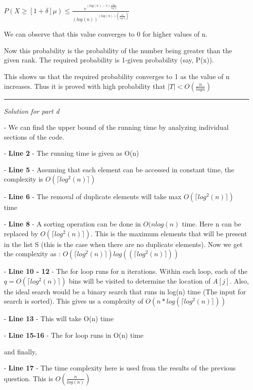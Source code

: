 \documentclass[11pt]{article}
\begin{document}
$P(X\geq [1+\delta]\mu) \leq \frac{e^{(log (n) -1) \frac{n}{log^2 n}}}{(log(n))^{(log(n))(\frac{n}{log^2 n})}}$

We can observe that this value converges to 0 for higher values of n.

Now this probability is the probability of the number being greater than the given rank. The required probability is 1-given probability (say, P(x)).

This shows us that the required probability converges to 1 as the value of n increases. Thus it is proved with high probability that $|T| < O(\frac{n}{log n})$ 





\medskip

\noindent\rule{8cm}{0.4pt}

\medskip

\textit{Solution for part d}

\medskip

- We can find the upper bound of the running time by analyzing individual sections of the code.

- {\bf Line 2} - The running time is given as O(n)

- {\bf Line 5} - Assuming that each element can be accessed in constant time, the complexity is $O(\lceil log^2 (n)\rceil)$

- {\bf Line 6} - The removal of duplicate elements will take max $O(\lceil log^2 (n)\rceil)$ time

- {\bf Line 8} - A sorting operation can be done in $O(n log(n)$ time. Here n can be replaced by $O(\lceil log^2 (n)\rceil)$. This is the maximum elements that will be present in the list S (this is the case when there are no duplicate elements). Now we get the complexity as : $O(\lceil log^2 (n)\rceil) log((\lceil log^2 (n)\rceil))$

- {\bf Line 10 - 12} - The for loop runs for n iterations. Within each loop, each of the $q = O(\lceil log^2 (n)\rceil)$ bins will be visited to determine the location of $A[j]$. Also, the ideal search would be a binary search that runs in log(n) time (The input for search is sorted). This gives us a complexity of $O(n*log(\lceil log^2 (n)\rceil))$

- {\bf Line 13} - This will take O(n) time

- {\bf Line 15-16} - The for loop runs in O(n) time

and finally,

- {\bf Line 17} - The time complexity here is used from the results of the previous question. This is $O(\frac{n}{log (n)})$
\end{document}
